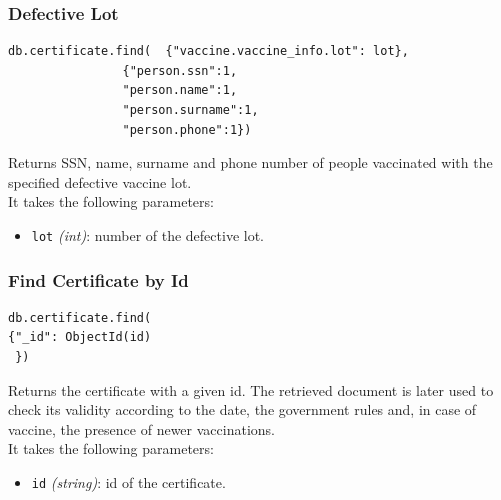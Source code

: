 \documentclass[12pt, a4paper]{article}
\begin{document}
\subsubsection{Defective Lot}
\begin{tcolorbox}[fontupper=\scriptsize]
    \begin{verbatim}
db.certificate.find(  {"vaccine.vaccine_info.lot": lot},
				{"person.ssn":1,
				"person.name":1,
				"person.surname":1,
				"person.phone":1})
    \end{verbatim}
\end{tcolorbox}

\noindent %
Returns SSN, name, surname and phone number of people vaccinated with the specified 
defective vaccine lot. \\
It takes the following parameters:
\begin{itemize}
    \item \texttt{lot} \emph{(int)}: number of the defective lot.
\end{itemize}

\subsubsection{Find Certificate by Id}
\begin{tcolorbox}[fontupper=\scriptsize]
    \begin{verbatim}
db.certificate.find(
{"_id": ObjectId(id)
 })
    \end{verbatim}
\end{tcolorbox}

\noindent %
Returns the certificate with a given id. The retrieved document is later used to check 
its validity according to the date, the government rules and, in case of vaccine, the 
presence of newer vaccinations. \\
It takes the following parameters:
\begin{itemize}
    \item \texttt{id} \emph{(string)}: id of the certificate.
\end{itemize}
\end{document}
